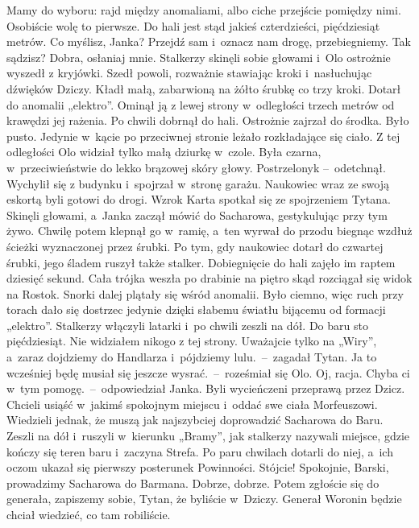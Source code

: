 \documentclass[../MAIN.tex]{subfiles}
\begin{document}
\sx Mamy do wyboru: rajd między anomaliami, albo ciche przejście pomiędzy nimi. Osobiście wolę to pierwsze. Do hali jest stąd jakieś czterdzieści, pięćdziesiąt metrów. Co myślisz, Janka?
\xx Przejdź sam i~oznacz nam drogę, przebiegniemy.
\xx Tak sądzisz? Dobra, osłaniaj mnie.
\qd
\hspace{17em}Stalkerzy skinęli sobie głowami i~Olo ostrożnie wyszedł z kryjówki. Szedł powoli, rozważnie stawiając kroki i~nasłuchując dźwięków Dziczy. Kładł małą, zabarwioną na żółto śrubkę co trzy kroki. Dotarł do anomalii „elektro”. Ominął ją z lewej strony w~odległości trzech metrów od krawędzi jej rażenia. Po chwili dobrnął do hali. Ostrożnie zajrzał do środka. Było pusto. Jedynie w~kącie po przeciwnej stronie leżało rozkładające się ciało. Z tej odległości Olo widział tylko małą dziurkę w~czole. Była czarna, w~przeciwieństwie do lekko brązowej skóry głowy.
\sx Postrzelony\3k --~odetchnął.
\qd
\hspace{13.4em}Wychylił się z budynku i~spojrzał w~stronę garażu. Naukowiec wraz ze swoją eskortą byli gotowi do drogi. Wzrok Karta spotkał się ze spojrzeniem Tytana. Skinęli głowami, a~Janka zaczął mówić do Sacharowa, gestykulując przy tym żywo. Chwilę potem klepnął go w~ramię, a~ten wyrwał do przodu biegnąc wzdłuż ścieżki wyznaczonej przez śrubki. Po tym, gdy naukowiec dotarł do czwartej śrubki, jego śladem ruszył także stalker. Dobiegnięcie do hali zajęło im raptem dziesięć sekund. Cała trójka weszła po drabinie na piętro skąd rozciągał się widok na Rostok. Snorki dalej plątały się wśród anomalii. Było ciemno, więc ruch przy torach dało się dostrzec jedynie dzięki słabemu światłu bijącemu od formacji „elektro”. Stalkerzy włączyli latarki i~po chwili zeszli na dół.
\sx Do baru sto pięćdziesiąt. Nie widziałem nikogo z tej strony. Uważajcie tylko na „Wiry”, a~zaraz dojdziemy do Handlarza i~pójdziemy lulu.~--~zagadał Tytan.
\xx Ja to wcześniej będę musiał się jeszcze wysrać.~--~roześmiał się Olo.
\xx Oj, racja. Chyba ci w~tym pomogę.~--~odpowiedział Janka.
\qd
\hspace{26.9em}Byli wycieńczeni przeprawą przez Dzicz. Chcieli usiąść w~jakimś spokojnym miejscu i~oddać swe ciała Morfeuszowi. Wiedzieli jednak, że muszą jak najszybciej doprowadzić Sacharowa do Baru. Zeszli na dół i~ruszyli w~kierunku „Bramy”, jak stalkerzy nazywali miejsce, gdzie kończy się teren baru i~zaczyna Strefa. Po paru chwilach dotarli do niej, a~ich oczom ukazał się pierwszy posterunek Powinności.
\sx Stójcie!
\xx Spokojnie, Barski, prowadzimy Sacharowa do Barmana.
\xx Dobrze, dobrze. Potem zgłoście się do generała, zapiszemy sobie, Tytan, że byliście w~Dziczy. Generał Woronin będzie chciał wiedzieć, co tam robiliście.
\end{document}
